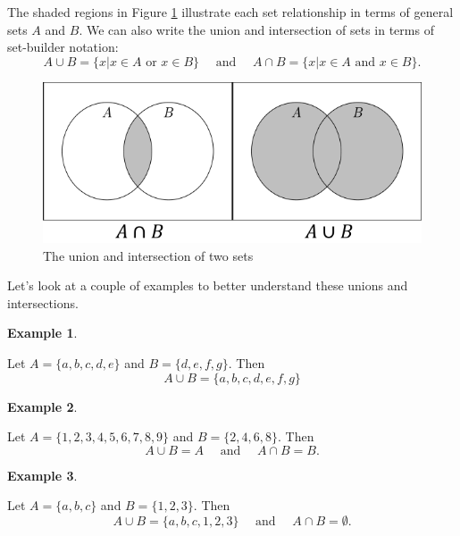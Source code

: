 \documentclass[
]{book}
\theoremstyle{definition}
\theoremstyle{definition}
\newtheorem{example}{Example}[chapter]
\theoremstyle{definition}
\theoremstyle{definition}
\theoremstyle{remark}
\begin{document}
The shaded regions in Figure \ref{fig:set-union} illustrate each set relationship in terms of general sets \(A\) and \(B\). We can also write the union and intersection of sets in terms of set-builder notation:
\[A\cup B = \{x \vert x\in A \mbox{ or } x\in B\} \quad \mbox{ and } \quad A\cap B =\{x\vert x\in A \mbox{ and } x\in B\}.\]

\begin{figure}

{\centering \includegraphics[width=0.7\linewidth]{tikz/Set_unions_intersections} 

}

\caption{The union and intersection of two sets}\label{fig:set-union}
\end{figure}

Let's look at a couple of examples to better understand these unions and intersections.

\begin{example}
\protect\hypertarget{exm:unlabeled-div-8}{}\label{exm:unlabeled-div-8}

Let \(A = \{a, b, c, d, e\}\) and \(B = \{ d, e, f, g\}\). Then \[A\cup B=\{a, b, c, d, e, f, g\} \]

\end{example}

\begin{example}
\protect\hypertarget{exm:unlabeled-div-9}{}\label{exm:unlabeled-div-9}

Let \(A=\{1,2,3,4,5,6,7,8,9\}\) and \(B=\{2,4,6,8\}\). Then
\[A \cup B = A \quad \mbox{ and } \quad A\cap B = B.\]

\end{example}

\begin{example}
\protect\hypertarget{exm:unlabeled-div-10}{}\label{exm:unlabeled-div-10}

Let \(A=\{a,b,c\}\) and \(B=\{1,2,3\}\). Then
\[A\cup B = \{a,b,c,1,2,3\} \quad \mbox{ and } \quad A\cap B =\emptyset.\]

\end{example}
\end{document}
